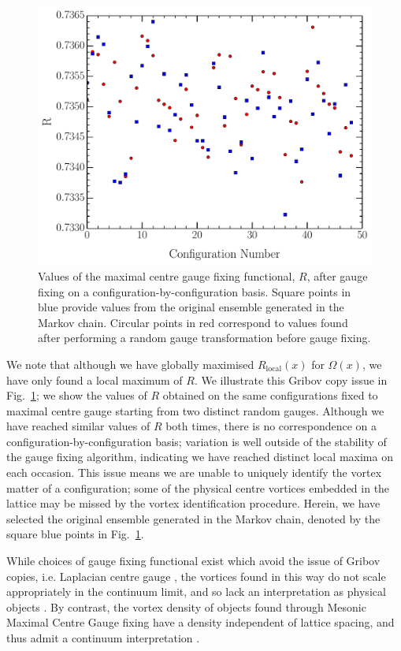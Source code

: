 \documentclass[
 reprint,
 amsmath,amssymb,
 aps,
prd,
]{revtex4-1}
\begin{document}
\begin{figure}[t!]
\includegraphics[width=\columnwidth]{Rcomparison.pdf}
\caption{Values of the maximal centre gauge fixing functional, $R$, after gauge fixing on a configuration-by-configuration basis. Square points in blue provide values from the original ensemble generated in the Markov chain. Circular points in red correspond to values found after performing a random gauge transformation before gauge fixing.}
\label{Rcomp}
\end{figure}
We note that although we have globally maximised $R_{\textrm{local}}(x)$ for $\Omega(x)$, we have only found a local maximum of $R$. We illustrate this Gribov copy issue in Fig.~\ref{Rcomp}; we show the values of $R$ obtained on the same configurations fixed to maximal centre gauge starting from two distinct random gauges. Although we have reached similar values of $R$ both times, there is no correspondence on a configuration-by-configuration basis; variation is well outside of the stability of the gauge fixing algorithm, indicating we have reached distinct local maxima on each occasion. This issue means we are unable to uniquely identify the vortex matter of a configuration; some of the physical centre vortices embedded in the lattice may be missed by the vortex identification procedure. Herein, we have selected the original ensemble generated in the Markov chain, denoted by the square blue points in Fig.~\ref{Rcomp}. \par
While choices of gauge fixing functional exist which avoid the issue of Gribov copies, i.e. Laplacian centre gauge \cite{Vink:1992ys,Vink:1994rb}, the vortices found in this way do not scale appropriately in the continuum limit, and so lack an interpretation as physical objects \cite{Langfeld:2003ev}. By contrast, the vortex density of objects found through Mesonic Maximal Centre Gauge fixing have a density independent of lattice spacing, and thus admit a continuum interpretation \cite{Bowman:2010zr,Langfeld:2003ev}.\par 
\end{document}
